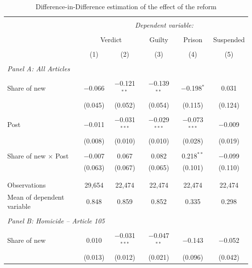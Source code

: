 \documentclass[12pt]{article}
\numberwithin{equation}{section}
\numberwithin{table}{section}
\numberwithin{figure}{section}
\begin{document}
  \begin{table}[!htbp] \centering \scriptsize
    \begin{threeparttable}
    \caption{Difference-in-Difference estimation of the effect of the reform} 
    \label{tab:did} 
  \begin{tabular}{@{\extracolsep{5pt}}lccccc} 
    \\[-1.8ex]\hline 
  \hline \\[-1.8ex] 
  & \multicolumn{5}{c}{\textit{Dependent variable:}}  \\ 
  \cline{2-6} 
  \\[-1.8ex] & \multicolumn{2}{c}{Verdict} & Guilty & Prison & Suspended \\ 
  \\[-1.8ex] & (1) & (2) & (3) & (4) & (5)\\ 
  \hline \\[-1.8ex] 
  \multicolumn{6}{l}{\textit{Panel A: All Articles}}\\[-1.8ex] \\
  Share of new & $-$0.066 & $-$0.121$^{**}$ & $-$0.139$^{**}$ & $-$0.198$^{*}$ & 0.031 \\ 
  & (0.045) & (0.052) & (0.054) & (0.115) & (0.124) \\ 
  & & & & & \\ 
 Post & $-$0.011 & $-$0.031$^{***}$ & $-$0.029$^{***}$ & $-$0.073$^{***}$ & $-$0.009 \\ 
  & (0.008) & (0.010) & (0.010) & (0.028) & (0.019) \\ 
  & & & & & \\ 
 Share of new $\times$ Post & $-$0.007 & 0.067 & 0.082 & 0.218$^{**}$ & $-$0.099 \\ 
  & (0.063) & (0.067) & (0.065) & (0.101) & (0.110) \\
  & & & & & \\[-1.8ex] 
 \hline\\[-1.8ex] 
  Observations & 29,654 & 22,474 & 22,474 & 22,474 & 22,474\\ 
  Mean of dependent variable& 0.848 &0.859& 0.852& 0.335& 0.298\\
  \hline \\[-1.8ex] 
  \multicolumn{6}{l}{\textit{Panel B: Homicide -- Article 105}}\\[-1.8ex] \\
  Share of new & 0.010 & $-$0.031$^{***}$ & $-$0.047$^{**}$ & $-$0.143 & $-$0.052 \\ 
  & (0.013) & (0.012) & (0.021) & (0.096) & (0.042) \\ 

\end{tabular}
\end{threeparttable}
\end{table}
\end{document}
